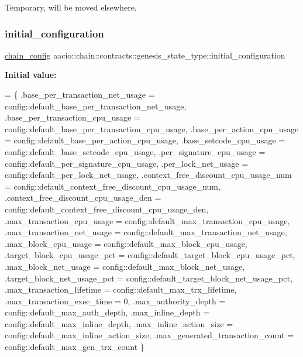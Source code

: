 Temporary, will be moved elsewhere. \mbox{\label{structaacio_1_1chain_1_1contracts_1_1genesis__state__type_a3a252cd3e3f1923603896d7bb010a159}} 
\subsubsection{\texorpdfstring{initial\+\_\+configuration}{initial\_configuration}}
{\footnotesize\ttfamily \mbox{\hyperlink{structaacio_1_1chain_1_1chain__config}{chain\+\_\+config}} aacio\+::chain\+::contracts\+::genesis\+\_\+state\+\_\+type\+::initial\+\_\+configuration}

{\bfseries Initial value\+:}
\begin{DoxyCode}
= \{
      .base\_per\_transaction\_net\_usage = config::default\_base\_per\_transaction\_net\_usage,
      .base\_per\_transaction\_cpu\_usage = config::default\_base\_per\_transaction\_cpu\_usage,
      .base\_per\_action\_cpu\_usage      = config::default\_base\_per\_action\_cpu\_usage,
      .base\_setcode\_cpu\_usage         = config::default\_base\_setcode\_cpu\_usage,
      .per\_signature\_cpu\_usage        = config::default\_per\_signature\_cpu\_usage,
      .per\_lock\_net\_usage             = config::default\_per\_lock\_net\_usage,
      .context\_free\_discount\_cpu\_usage\_num      = config::default\_context\_free\_discount\_cpu\_usage\_num,
      .context\_free\_discount\_cpu\_usage\_den      = config::default\_context\_free\_discount\_cpu\_usage\_den,
      .max\_transaction\_cpu\_usage      = config::default\_max\_transaction\_cpu\_usage,
      .max\_transaction\_net\_usage      = config::default\_max\_transaction\_net\_usage,
      .max\_block\_cpu\_usage            = config::default\_max\_block\_cpu\_usage,
      .target\_block\_cpu\_usage\_pct     = config::default\_target\_block\_cpu\_usage\_pct,
      .max\_block\_net\_usage            = config::default\_max\_block\_net\_usage,
      .target\_block\_net\_usage\_pct     = config::default\_target\_block\_net\_usage\_pct,
      .max\_transaction\_lifetime       = config::default\_max\_trx\_lifetime,
      .max\_transaction\_exec\_time      = 0, 
      .max\_authority\_depth            = config::default\_max\_auth\_depth,
      .max\_inline\_depth               = config::default\_max\_inline\_depth,
      .max\_inline\_action\_size         = config::default\_max\_inline\_action\_size,
      .max\_generated\_transaction\_count = config::default\_max\_gen\_trx\_count
   \}
\end{DoxyCode}


